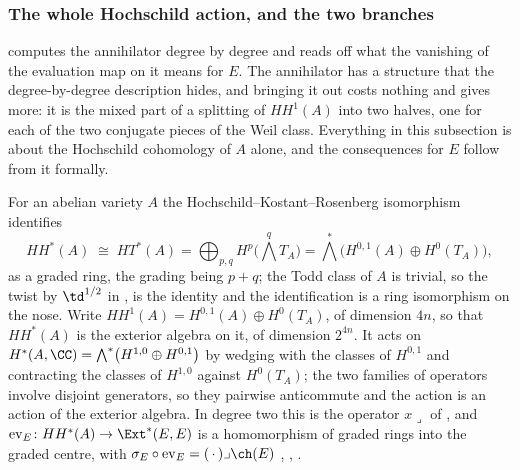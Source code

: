 \subsubsection*{The whole Hochschild action, and the two branches}

 computes the annihilator degree by degree and reads off
what the vanishing of the evaluation map on it means for $E$. The annihilator
has a structure that the degree-by-degree description hides, and bringing it
out costs nothing and gives more: it is the mixed part of a splitting of
$HH^{1}(A)$ into two halves, one for each of the two conjugate pieces of the
Weil class. Everything in this subsection is about the Hochschild cohomology
of $A$ alone, and the consequences for $E$ follow from it formally.

\begin{setupenv}\label{setup:hh}
For an abelian variety $A$ the Hochschild--Kostant--Rosenberg isomorphism
identifies
\[
  HH^{*}(A)\;\cong\;HT^{*}(A)=\bigoplus_{p,q}H^{p}\bigl(\textstyle\bigwedge^{q}T_{A}\bigr)
  =\textstyle\bigwedge^{*}\bigl(H^{0,1}(A)\oplus H^{0}(T_{A})\bigr),
\]
as a graded ring, the grading being $p+q$; the Todd class of $A$ is trivial,
so the twist by $\td^{1/2}$ in \cite{Cal05}, \cite{CRV12} is the identity and
the identification is a ring isomorphism on the nose. Write
$HH^{1}(A)=H^{0,1}(A)\oplus H^{0}(T_{A})$, of dimension $4n$, so that
$HH^{*}(A)$ is the exterior algebra on it, of dimension $2^{4n}$. It acts on
$H^{*}(A,\CC)=\bigwedge^{*}\bigl(H^{1,0}\oplus H^{0,1}\bigr)$ by wedging with
the classes of $H^{0,1}$ and contracting the classes of $H^{1,0}$ against
$H^{0}(T_{A})$; the two families of operators involve disjoint generators, so
they pairwise anticommute and the action is an action of the exterior algebra.
In degree two this is the operator $x\lrcorner$ of , and
$\operatorname{ev}_{E}\colon HH^{*}(A)\to\Ext^{*}(E,E)$ is a homomorphism of
graded rings into the graded centre, with
$\sigma_{E}\circ\operatorname{ev}_{E}=(\,\cdot\,)\lrcorner\ch(E)$
\cite[Section 6]{BF08}, \cite{Cal05}, \cite{CRV12}.
\end{setupenv}

